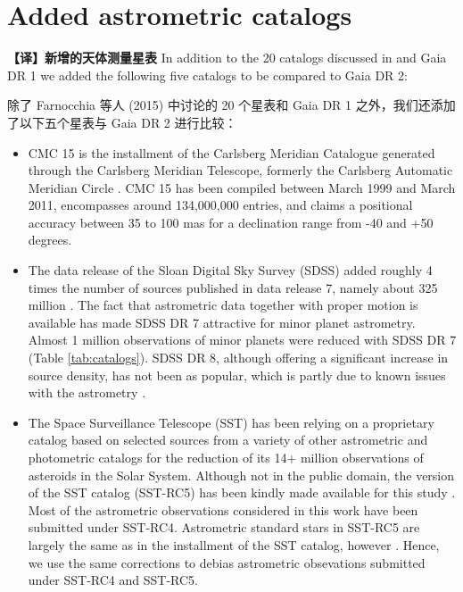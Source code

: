 \documentclass[review]{elsarticle}
\begin{document}
\section{Added astrometric catalogs} 
\textbf{【译】新增的天体测量星表}
\label{sec:cats}
In addition to the 20 catalogs discussed in \citet{farnocchia15} and Gaia DR 1 we added the following five catalogs to be compared to Gaia DR 2:

除了 Farnocchia 等人 (2015) 中讨论的 20 个星表和 Gaia DR 1 之外，我们还添加了以下五个星表与 Gaia DR 2 进行比较：
\begin{itemize}
\item CMC 15 is the  installment of the Carlsberg Meridian Catalogue generated through the Carlsberg Meridian Telescope, formerly the Carlsberg Automatic Meridian Circle \citep{cmc15}. CMC 15 has been compiled between March 1999 and March 2011, encompasses around 134,000,000 entries, and claims a positional accuracy between 35 to 100 mas for a declination range from -40 and +50 degrees.

\item The  data release of the Sloan Digital Sky Survey (SDSS) added roughly 4 times the number of sources published in data release 7, namely about 325 million \citep{sdss8}. The fact that astrometric data together with proper motion is available has made SDSS DR 7 \citep{sdss7} attractive for minor planet astrometry. Almost 1 million observations of minor planets were reduced with SDSS DR 7 (Table \ref{tab:catalogs}). SDSS DR 8, although offering a significant increase in source density, has not been as popular, which is partly due to known issues with the astrometry \citep{sdss8_astrometry}.         

\item The Space Surveillance Telescope (SST) has been relying on a proprietary catalog based on selected sources from a variety of other astrometric and photometric catalogs for the reduction of its 14+ million observations of asteroids in the Solar System. Although not in the public domain, the  version of the SST catalog (SST-RC5) has been kindly made available for this study \citep{sstrc5}. Most of the astrometric observations considered in this work have been submitted under SST-RC4. Astrometric standard stars in SST-RC5 are largely the same as in the  installment of the SST catalog, however \citep{sstrc5}. Hence, we use the same corrections to debias astrometric obsevations submitted under SST-RC4 and SST-RC5. 


\end{itemize}
\end{document}
